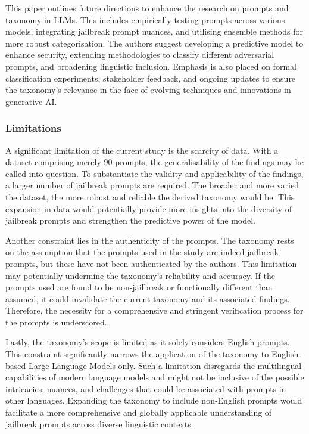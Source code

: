 \documentclass[
  letterpaper,
  DIV=11,
  numbers=noendperiod]{scrartcl}
\begin{document}
This paper outlines future directions to enhance the research on prompts
and taxonomy in LLMs. This includes empirically testing prompts across
various models, integrating jailbreak prompt nuances, and utilising
ensemble methods for more robust categorisation. The authors suggest
developing a predictive model to enhance security, extending
methodologies to classify different adversarial prompts, and broadening
linguistic inclusion. Emphasis is also placed on formal classification
experiments, stakeholder feedback, and ongoing updates to ensure the
taxonomy's relevance in the face of evolving techniques and innovations
in generative AI.

\subsubsection{Limitations}\label{limitations}

A significant limitation of the current study is the scarcity of data.
With a dataset comprising merely 90 prompts, the generalisability of the
findings may be called into question. To substantiate the validity and
applicability of the findings, a larger number of jailbreak prompts are
required. The broader and more varied the dataset, the more robust and
reliable the derived taxonomy would be. This expansion in data would
potentially provide more insights into the diversity of jailbreak
prompts and strengthen the predictive power of the model.

Another constraint lies in the authenticity of the prompts. The taxonomy
rests on the assumption that the prompts used in the study are indeed
jailbreak prompts, but these have not been authenticated by the authors.
This limitation may potentially undermine the taxonomy's reliability and
accuracy. If the prompts used are found to be non-jailbreak or
functionally different than assumed, it could invalidate the current
taxonomy and its associated findings. Therefore, the necessity for a
comprehensive and stringent verification process for the prompts is
underscored.

Lastly, the taxonomy's scope is limited as it solely considers English
prompts. This constraint significantly narrows the application of the
taxonomy to English-based Large Language Models only. Such a limitation
disregards the multilingual capabilities of modern language models and
might not be inclusive of the possible intricacies, nuances, and
challenges that could be associated with prompts in other languages.
Expanding the taxonomy to include non-English prompts would facilitate a
more comprehensive and globally applicable understanding of jailbreak
prompts across diverse linguistic contexts.
\end{document}

